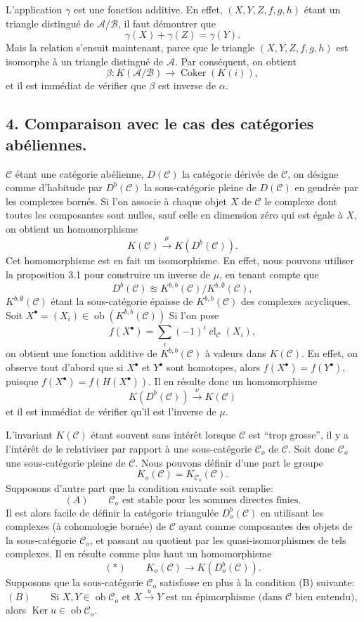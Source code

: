 \documentclass[11pt]{article}
\providecommand{\Ob}{\operatorname{ob}}
\providecommand{\cC}{\mathcal C}
\providecommand{\Ob}{\operatorname{ob}}
\providecommand{\cC}{\mathcal C}
\providecommand{\cA}{\mathcal A}
\providecommand{\cB}{\mathcal B}
\providecommand{\Ob}{\operatorname{Ob}}
\providecommand{\Ob}{\operatorname{ob}}
\providecommand{\Ob}{\operatorname{Ob}}
\begin{document}
L'application $\gamma$ est une fonction additive. En effet, $(X,Y,Z,f,g,h)$ étant un triangle distingué de $\cA/\cB$, il faut démontrer que
\[
\gamma(X)+\gamma(Z)=\gamma(Y).
\]
Mais la relation s'ensuit maintenant, parce que le triangle $(X,Y,Z,f,g,h)$ est isomorphe à un triangle distingué de $\cA$. Par conséquent, on obtient
\[
\beta:K(\cA/\cB)\longrightarrow \operatorname{Coker}(K(i)),
\]
et il est immédiat de vérifier que $\beta$ est inverse de $\alpha$.

\subsection*{4. Comparaison avec le cas des catégories abéliennes.}

$\cC$ étant une catégorie abélienne, $D(\cC)$ la catégorie dérivée de $\cC$, on désigne comme d'habitude par $D^b(\cC)$ la sous-catégorie pleine de $D(\cC)$ 
en%
gendrée par les
complexes bornés. Si l'on associe à chaque objet $X$ de $\cC$ le complexe dont toutes les composantes sont nulles, sauf celle en dimension zéro qui est égale à $X$, on obtient un homomorphisme
\[
K(\cC)\xrightarrow{\mu}K(D^b(\cC)).
\]
Cet homomorphisme est en fait un isomorphisme. En effet, nous pouvons utiliser la proposition 3.1 pour construire un inverse de $\mu$, en tenant compte que
\[
D^b(\cC)\approxeq K^{b,b}(\cC)/K^{b,\emptyset}(\cC),
\]
$K^{b,\emptyset}(\cC)$ étant la sous-catégorie épaisse de $K^{b,b}(\cC)$ des complexes acycliques. Soit $X^\bullet=(X_i)\in\Ob(K^{b,b}(\cC))$ Si l'on pose
\[
f(X^\bullet)=\sum_i(-1)^i\operatorname{cl}_{\cC}(X_i),
\]
on obtient une fonction additive de $K^{b,b}(\cC)$ à valeurs dans $K(\cC)$. En effet, on observe tout d'abord que si $X^\bullet$ et $Y^\bullet$ sont homotopes, alors $f(X^\bullet)=f(Y^\bullet)$, puisque $f(X^\bullet)=f(H(X^\bullet))$. Il en résulte donc un homomorphisme
\[
K(D^b(\cC))\xrightarrow{\nu}K(\cC)
\]
et il est immédiat de vérifier qu'il est l'inverse de $\mu$.

L'invariant $K(\cC)$ étant souvent sans intérêt lorsque $\cC$ est ``trop grosse'', il y a l'intérêt de le relativiser par rapport à une sous-catégorie $\cC_o$ de $\cC$. Soit donc $\cC_o$ une sous-catégorie pleine de $\cC$. Nous pouvons définir d'une part le groupe
\[
K_o(\cC)=K_{\cC_o}(\cC).
\]
Supposons d'autre part que la condition suivante soit remplie:
\[
(A)\qquad \cC_o\text{ est stable pour les sommes directes finies.}
\]
Il est alors facile de définir la catégorie triangulée $D_o^b(\cC)$ en utilisant les complexes (à cohomologie bornée) de $\cC$ ayant comme composantes des objets de la sous-catégorie $\cC_o$, et passant au
quotient par les quasi-isomorphismes de tels complexes. Il en résulte comme plus haut un homomorphisme
\[
(*)\qquad K_o(\cC)\longrightarrow K(D_o^b(\cC)).
\]
Supposons que la sous-catégorie $\cC_o$ satisfasse en plus à la condition (B) suivante:
\[
(B)\qquad
\text{Si }X,Y\in\Ob\cC_o\text{ et }X\xrightarrow{u}Y
\text{ est un épimorphisme (dans }\cC\text{ bien entendu)},
\]
alors $\operatorname{Ker}u\in\Ob\cC_o$.
\end{document}
